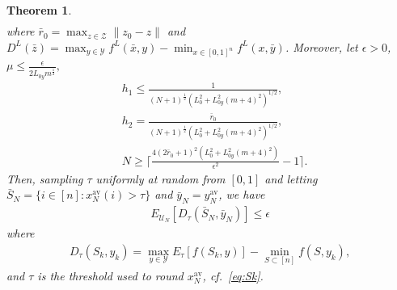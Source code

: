 \documentclass{article}
\theoremstyle{plain}
\newtheorem{theorem}{Theorem}[section]
\theoremstyle{definition}
\theoremstyle{remark}
\begin{document}
\begin{theorem}
{\begin{align}
    \end{align}}%
    where $\bar{r}_0=\max_{z\in\mathcal{Z}}\|z_0-z\|$ and $D^L(\bar{z}) =\max_{y\in\mathcal{Y}}f^L(\bar{x},y)-\min_{x\in[0,1]^n}f^L(x,\bar{y})$.
    Moreover, let $\epsilon>0$, $\mu\leq\frac{\epsilon}{2{L_{0y}}m^{\frac{1}{2}}},$
    \begin{align*}
      &h_1 \leq \frac{1}{(N+1)^{\frac{1}{2}}({L_0^2}+L_{0y}^2(m+4)^2)^{1/2}}, \\
      & h_2 = \frac{\bar{r}_0}{(N+1)^{\frac{1}{2}}({L_0^2}+L_{0y}^2(m+4)^2)^{1/2}},  \\
      & N\geq\Big\lceil \frac{4({2\bar{r}_0}+1)^2({L_0^2}+L_{0y}^2(m+4)^2)}{\epsilon^2}-1\Big\rceil.
    \end{align*}
Then, sampling $\tau$ uniformly at random from $[0,1]$ and letting $\bar{S}_N=\{i\in[n]: x^{\mathrm{av}}_N(i)>\tau\}$ and $\bar{y}_N=y^{\mathrm{av}}_N$, we have
    \begin{align}\label{eq:eqoff2}
	E_{\mathcal{U}_{{N}}}[D_\tau(\bar{S}_N,\bar{y}_N)]\leq\epsilon
    \end{align}
    where
    \begin{align*}
    D_\tau(S_k,y_k) = \max_{y\in\mathcal{Y}}E_\tau[f(S_k,y)]-\min_{S \subset [n]}f(S,y_k),
     \end{align*}
    and $\tau$ is the threshold used to round $x^{\mathrm{av}}_N$, cf.\ \eqref{eq:Sk}.

\end{theorem}
\end{document}
